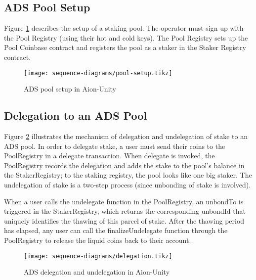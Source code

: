 \subsection{ADS Pool Setup}
Figure \ref{fig:pool_setup} describes the setup of a staking pool. The operator must sign up with the Pool Registry (using their hot and cold keys). The Pool Registry sets up the Pool Coinbase contract and registers the pool as a staker in the Staker Registry contract. 

\begin{figure}[ht]
\centering
\texttt{[image: sequence-diagrams/pool-setup.tikz]}
\caption{ADS pool setup in Aion-Unity}
\label{fig:pool_setup}
\end{figure}
\clearpage

\subsection{Delegation to an ADS Pool}
Figure \ref{fig:delegation} illustrates the mechanism of delegation and undelegation of stake to an ADS pool. In order to delegate stake, a user must send their coins to the PoolRegistry in a delegate transaction. When delegate is invoked, the PoolRegistry records the delegation and adds the stake to the pool's balance in the StakerRegistry; to the staking registry, the pool looks like one big staker. The undelegation of stake is a two-step process (since unbonding of stake is involved). 

When a user calls the undelegate function in the PoolRegistry, an unbondTo is triggered in the StakerRegistry, which returns the corresponding unbondId that uniquely identifies the thawing of this parcel of stake. After the thawing period has elapsed, any user can call the finalizeUndelegate function through the PoolRegistry to release the liquid coins back to their account. 

\begin{figure}[ht]
\centering
\texttt{[image: sequence-diagrams/delegation.tikz]}
\caption{ADS delegation and undelegation in Aion-Unity}
\label{fig:delegation}
\end{figure}
\clearpage

